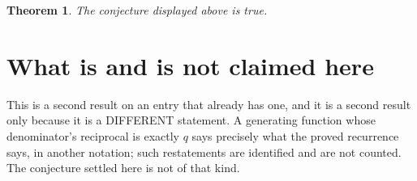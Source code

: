 \documentclass[11pt,a4paper]{article}
\theoremstyle{plain}
\newtheorem{theorem}{Theorem}
\theoremstyle{definition}
\begin{document}
\begin{theorem}
The conjecture displayed above is true.
\end{theorem}

\section{What is and is not claimed here}

This is a second result on an entry that already has one, and it is a second result only because
it is a DIFFERENT statement. A generating function whose denominator's reciprocal is exactly $q$
says precisely what the proved recurrence says, in another notation; such restatements are
identified and are not counted. The conjecture settled here is not of that kind.
\end{document}
